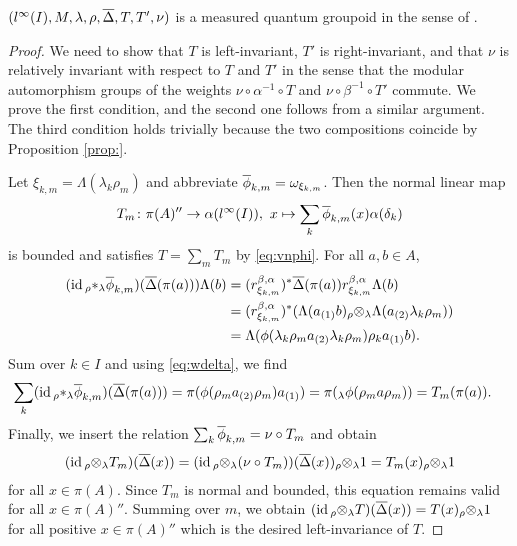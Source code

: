 \begin{Theorem}
    $(l^{\infty}(I),M,\lambda,\rho,\overline{\Delta},T,T',\nu)$
  is a measured quantum groupoid in the sense of \cite{enock:action}.
\end{Theorem}
\begin{proof}
  We need to show that $T$ is left-invariant, $T'$ is right-invariant,
  and that $\nu$ is relatively invariant with respect to $T$ and $T'$
  in the sense that the modular automorphism groups of the weights
  $\nu \circ \alpha^{-1} \circ T$ and $\nu \circ \beta^{-1} \circ T'$
  commute.  We prove the first condition, and the second one follows from
  a similar argument. The third condition holds trivially because the
  two compositions coincide by Proposition \ref{prop:}. 

  Let $\xi_{k,m}=\Lambda(\lambda_{k}\rho_{m})$ and abbreviate
  $\overline{\phi}_{k,m}=\omega_{\xi_{k,m}}$. Then the normal linear map
  \begin{align*}
    T_{m}\colon \pi(A)'' \to \alpha(l^{\infty}(I)), \ x\mapsto \sum_{k} \overline{\phi}_{k,m}(x)\alpha(\delta_{k})
  \end{align*}
  is bounded and satisfies $T=\sum_{m} T_{m}$ by
  \eqref{eq:vnphi}. For all $a,b\in
  A$,
  \begin{align*}
    (\operatorname{id} {_{\rho}\ast_{\lambda}} \overline{\phi}_{k,m})(\overline{\Delta}(\pi(a)))\Lambda(b) &=
    (r^{\beta,\alpha}_{\xi_{k,m}})^{*}\overline{\Delta}(\pi(a))r^{\beta,\alpha}_{\xi_{k,m}}
    \Lambda(b) \\
    &= (r^{\beta,\alpha}_{\xi_{k,m}})^{*}(\Lambda(a_{(1)}b)
    {_{\rho} \otimes_{\lambda}} \Lambda(a_{(2)}\lambda_{k}\rho_{m})) \\
    &=
    \Lambda(\phi(\lambda_{k}\rho_{m}a_{(2)}\lambda_{k}\rho_{m})\rho_{k}a_{(1)}b).
  \end{align*}
  Sum over $k \in I$ and using \eqref{eq:wdelta}, we find
  \begin{align*}
 \sum_{k} (\operatorname{id}
 {_{\rho}\ast_{\lambda}} \overline{\phi}_{k,m})(\overline{\Delta}(\pi(a))) &=
\pi(\phi(\rho_{m}a_{(2)}\rho_{m})a_{(1)})  =
\pi(_{\lambda}\phi(\rho_{m}a\rho_{m})) = T_{m}(\pi(a)).
  \end{align*}
  Finally, we insert the relation $\sum_{k} \overline{\phi}_{k,m} = \nu \circ
  T_{m}$ and obtain
\begin{align*}
  (\operatorname{id} {_{\rho}\otimes_{\lambda}} T_{m})(\overline{\Delta}(x)) = (\operatorname{id} {_{\rho}\otimes_{\lambda}}
  (\nu \circ T_{m}))(\overline{\Delta}(x)) {_{\rho}\otimes_{\lambda}} 1 = T_{m}(x)  {_{\rho}\otimes_{\lambda}} 1
\end{align*}
for all $x\in \pi(A)$.  Since $T_{m}$ is normal and bounded, this
equation remains valid for all $x\in \pi(A)''$. Summing over $m$, we
obtain $(\operatorname{id} {_{\rho}\otimes_{\lambda}} T)(\overline{\Delta}(x)) = T(x)  {_{\rho}\otimes_{\lambda}} 1$ for all
positive $x \in \pi(A)''$ which is the desired left-invariance of $T$.
\end{proof}


